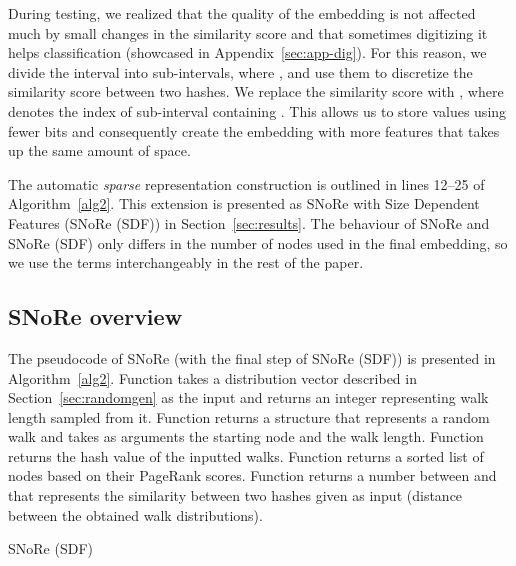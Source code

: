 \documentclass[twoside,11pt]{article}
\begin{document}
During testing, we realized that the quality of the embedding is not affected much by small changes in the similarity score and that sometimes digitizing it helps classification (showcased in  Appendix~\ref{sec:app-dig}). For this reason, we divide the interval  into  sub-intervals, where , and use them to discretize the similarity score between two hashes. We replace the similarity score  with , where  denotes the index of sub-interval containing . This allows us to store values using fewer bits and consequently create the embedding with more features that takes up the same amount of space.

The automatic \emph{sparse} representation construction is outlined in lines 12--25 of Algorithm~\ref{alg2}. This extension is presented as SNoRe with Size Dependent Features (SNoRe (SDF)) in Section~\ref{sec:results}. The behaviour of SNoRe and SNoRe (SDF) only differs in the number of nodes used in the final embedding, so we use the terms interchangeably in the rest of the paper. 

\subsection{SNoRe overview}
\label{sec:overview}
The pseudocode of SNoRe (with the final step of SNoRe (SDF)) is presented in Algorithm~\ref{alg2}. Function  takes a distribution vector described in Section~\ref{sec:randomgen} as the input and returns an integer representing walk length sampled from it. Function  returns a structure that represents a random walk and takes as arguments the starting node and the walk length. Function  returns the hash value of the inputted walks. Function  returns a sorted list of nodes based on their PageRank scores. Function  returns a number between  and  that represents the similarity between two hashes given as input (distance between the obtained walk distributions).

\begin{algorithm}
\caption{SNoRe (SDF)}
\label{alg2}
\SetAlgoLined
{}
\begin{algorithmic}[1]
    \STATE  {}
    \FOR{ \TO  } 
        \FOR{ \TO }
            \STATE 
        \ENDFOR
    \ENDFOR   
    \STATE  {}
    \FOR{ \TO  } 
        \STATE 
    \ENDFOR   
    \STATE  {}
    \STATE 
    \STATE  {}
    \WHILE{}
        \STATE 
        \STATE 
        \FOR{ \TO  } 
            \STATE  {}
            \STATE 
            \IF{}
                \STATE 
            \ENDIF
        \ENDFOR
        \STATE 
    \ENDWHILE
    \RETURN 
\end{algorithmic}
\end{algorithm}
\end{document}
